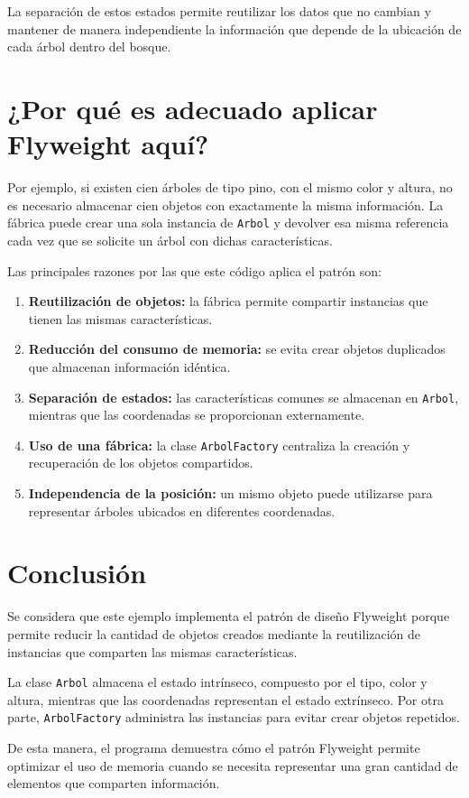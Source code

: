 \documentclass{article}
\begin{document}
La separación de estos estados permite reutilizar los datos que no
cambian y mantener de manera independiente la información que depende
de la ubicación de cada árbol dentro del bosque.

\section{¿Por qué es adecuado aplicar Flyweight aquí?}

Por ejemplo, si existen cien árboles de tipo pino, con el mismo color
y altura, no es necesario almacenar cien objetos con exactamente la
misma información. La fábrica puede crear una sola instancia de
\texttt{Arbol} y devolver esa misma referencia cada vez que se solicite
un árbol con dichas características.

Las principales razones por las que este código aplica el patrón son:

\begin{enumerate}
    \item \textbf{Reutilización de objetos:} la fábrica permite
    compartir instancias que tienen las mismas características.

    \item \textbf{Reducción del consumo de memoria:} se evita crear
    objetos duplicados que almacenan información idéntica.

    \item \textbf{Separación de estados:} las características comunes
    se almacenan en \texttt{Arbol}, mientras que las coordenadas se
    proporcionan externamente.

    \item \textbf{Uso de una fábrica:} la clase
    \texttt{ArbolFactory} centraliza la creación y recuperación de
    los objetos compartidos.

    \item \textbf{Independencia de la posición:} un mismo objeto
    puede utilizarse para representar árboles ubicados en diferentes
    coordenadas.
\end{enumerate}

\section*{Conclusión}

Se considera que este ejemplo implementa el patrón de diseño
Flyweight porque permite reducir la cantidad de objetos creados
mediante la reutilización de instancias que comparten las mismas
características.

La clase \texttt{Arbol} almacena el estado intrínseco, compuesto por
el tipo, color y altura, mientras que las coordenadas representan
el estado extrínseco. Por otra parte,
\texttt{ArbolFactory} administra las instancias para evitar crear
objetos repetidos.

De esta manera, el programa demuestra cómo el patrón Flyweight
permite optimizar el uso de memoria cuando se necesita representar
una gran cantidad de elementos que comparten información.
\end{document}

